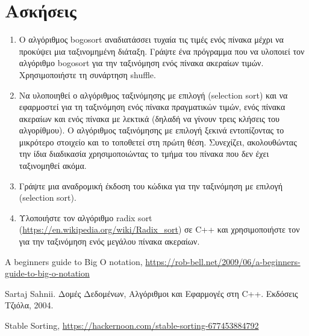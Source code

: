 \section{Ασκήσεις}
\begin{enumerate}[nolistsep]
\item Ο αλγόριθμος bogosort αναδιατάσσει τυχαία τις τιμές ενός πίνακα μέχρι να προκύψει μια ταξινομημένη διάταξη. Γράψτε ένα πρόγραμμα που να υλοποιεί τον αλγόριθμο bogosort για την ταξινόμηση ενός πίνακα ακεραίων τιμών. Χρησιμοποιήστε τη συνάρτηση shuffle. 
\item Να υλοποιηθεί ο αλγόριθμος ταξινόμησης με επιλογή (selection sort) και να εφαρμοστεί για τη ταξινόμηση ενός πίνακα πραγματικών τιμών, ενός πίνακα ακεραίων και ενός πίνακα με λεκτικά (δηλαδή να γίνουν τρεις κλήσεις του αλγορίθμου). Ο αλγόριθμος ταξινόμησης με επιλογή ξεκινά εντοπίζοντας το μικρότερο στοιχείο και το τοποθετεί στη πρώτη θέση. Συνεχίζει, ακολουθώντας την ίδια διαδικασία χρησιμοποιώντας το τμήμα του πίνακα που δεν έχει ταξινομηθεί ακόμα. 
\item Γράψτε μια αναδρομική έκδοση του κώδικα για την ταξινόμηση με επιλογή (selection sort).
\item Υλοποιήστε τον αλγόριθμο radix sort (\href{https://en.wikipedia.org/wiki/Radix_sort}{https://en.wikipedia.org/wiki/Radix\_sort}) σε C++ και χρησιμοποιήστε τον για την ταξινόμηση ενός μεγάλου πίνακα ακεραίων.

\end{enumerate}


\begin{thebibliography}{9}
A beginners guide to Big O notation, \href{https://rob-bell.net/2009/06/a-beginners-guide-to-big-o-notation}{https://rob-bell.net/2009/06/a-beginners-guide-to-big-o-notation}

Sartaj Sahnii. Δομές Δεδομένων, Αλγόριθμοι και Εφαρμογές στη C++. Εκδόσεις Τζιόλα, 2004.

Stable Sorting, \href{https://hackernoon.com/stable-sorting-677453884792}{https://hackernoon.com/stable-sorting-677453884792}
\end{thebibliography}

